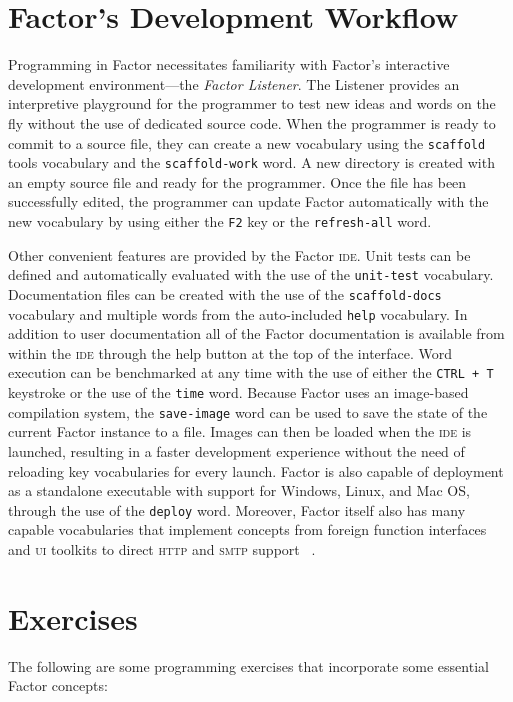 \documentclass[sigconf]{acmart}
\begin{document}
\section{Factor's Development Workflow}
Programming in Factor necessitates familiarity with Factor's
interactive development environment---the \textit{Factor
Listener}. The Listener provides an interpretive playground
for the programmer to test new ideas and words on the fly without
the use of dedicated source code. When the programmer is ready
to commit to a source file, they can create a new vocabulary 
using the \texttt{scaffold} tools vocabulary and the
\texttt{scaffold-work} word. A new directory is created with an
empty source file and ready for the programmer. Once the file has
been successfully edited, the programmer can update Factor 
automatically with the new vocabulary by using either the 
\texttt{F2} key or the \texttt{refresh-all} word.

Other convenient features are provided by the Factor \textsc{ide}.
Unit tests can be defined and automatically evaluated with the
use of the \texttt{unit-test} vocabulary. Documentation files
can be created with the use of the \texttt{scaffold-docs}
vocabulary and multiple words from the auto-included \texttt{help}
vocabulary. In addition to user documentation all of the 
Factor documentation is available from within the \textsc{ide}
through the help button at the top of the interface. Word 
execution can be benchmarked at any time with the use of either 
the \verb|CTRL + T| keystroke or the use of the \texttt{time} word.
Because Factor uses an image-based compilation system, the 
\texttt{save-image} word can be used to save the state of the 
current Factor instance to a file. Images can then be loaded 
when the \textsc{ide} is launched, resulting in a faster development 
experience without the need of reloading key vocabularies for
every launch. Factor is also capable of deployment as a 
standalone executable with support for Windows,
Linux, and Mac OS, through the use of the \texttt{deploy} word.
Moreover, Factor itself also has many capable vocabularies that 
implement concepts from foreign function interfaces and \textsc{ui}
toolkits to direct \textsc{http} and \textsc{smtp} support
~\cite{pestov:Factor}.

\section{Exercises}

The following are some programming exercises that incorporate
some essential Factor concepts:
\end{document}
